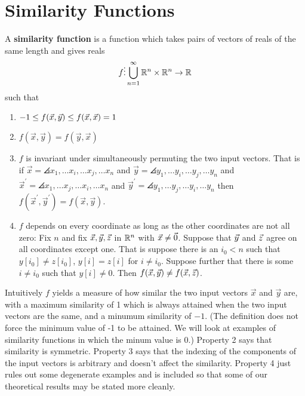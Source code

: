 \documentclass{article}
\begin{document}
\section{Similarity Functions}


\begin{definition}
A \textbf{similarity function} is a function which takes pairs of
vectors of reals of the same length and gives reals
\begin{equation}
f\vdots\bigcup\limits_{n=1}^{\infty}\mathbb{R}^{n}\times\mathbb{R}^{n}\rightarrow\mathbb{R}
\end{equation} 
such that
\begin{enumerate}
  \item $-1\leq f(\vec{x},\vec{y})\leq f(\vec{x},\vec{x}) = 1$
  \item $f(\vec{x},\vec{y})=f(\vec{y},\vec{x})$
  \item $f$ is invariant under simultaneously permuting the two input vectors.
  That is if $\vec{x} = \angles{x_1,\dots x_i,\dots x_j,\dots x_n} $
  and $\vec{y}=\angles{y_1,\dots y_i,\dots y_j,\dots y_n}$
  and $\vec{x}^{\prime}=\angles{x_1,\dots x_j,\dots x_i,\dots x_n}$
  and $\vec{y}^{\prime}=\angles{y_1,\dots y_j,\dots y_i,\dots y_n}$ then
  $f(\vec{x}^{\prime},\vec{y}^{\prime})=f(\vec{x},\vec{y})$.
  \item $f$ depends on every coordinate as long as the other coordinates are not
  all zero: Fix $n$ and fix $\vec{x},\vec{y},\vec{z}$ in $\mathbb{R}^{n}$ with
  $\vec{x}\not=\vec{0}$.
  Suppose that $\vec{y}$ and $\vec{z}$ agree on all coordinates except one. That is
  suppose there is an $i_0<n$ such that $y[i_0] \not = z[i_0]$, $y[i]=z[i]$ for
  $i\not=i_0$. Suppose further that there is some $i\not=i_0$ such that $y[i]\not=0$.
  Then $f(\vec{x},\vec{y})\not=f(\vec{x},\vec{z})$.
\end{enumerate}
\end{definition}

Intuitively $f$ yields a measure of how
similar the two input vectors $\vec{x}$ and $\vec{y}$ are, with a maximum
similarity of 1 which is always attained when the two input vectors are the
same, and a minumum similarity of $-1$. (The definition does not force
the minimum value of -1 to be attained. We will look at examples of similarity
functions in which the minum value is 0.) Property 2 says that similarity is
symmetric. Property 3 says that the indexing of the components of the input
vectors is arbitrary and doesn't affect the similarity. Property 4 just rules
out some degenerate examples and is included so that some of our theoretical
results may be stated more cleanly.
\end{document}
